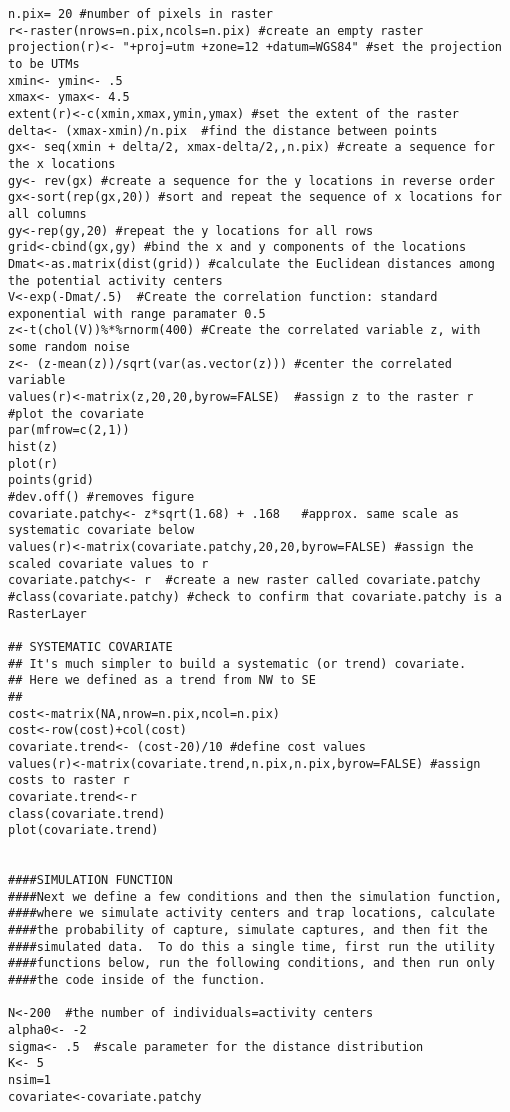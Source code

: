 \documentclass[12pt]{article}
\begin{document}
\begin{spacing}{1.2}
{\begin{verbatim}
n.pix= 20 #number of pixels in raster
r<-raster(nrows=n.pix,ncols=n.pix) #create an empty raster
projection(r)<- "+proj=utm +zone=12 +datum=WGS84" #set the projection to be UTMs
xmin<- ymin<- .5
xmax<- ymax<- 4.5
extent(r)<-c(xmin,xmax,ymin,ymax) #set the extent of the raster
delta<- (xmax-xmin)/n.pix  #find the distance between points 
gx<- seq(xmin + delta/2, xmax-delta/2,,n.pix) #create a sequence for the x locations
gy<- rev(gx) #create a sequence for the y locations in reverse order
gx<-sort(rep(gx,20)) #sort and repeat the sequence of x locations for all columns
gy<-rep(gy,20) #repeat the y locations for all rows
grid<-cbind(gx,gy) #bind the x and y components of the locations
Dmat<-as.matrix(dist(grid)) #calculate the Euclidean distances among the potential activity centers 
V<-exp(-Dmat/.5)  #Create the correlation function: standard exponential with range paramater 0.5
z<-t(chol(V))%*%rnorm(400) #Create the correlated variable z, with some random noise
z<- (z-mean(z))/sqrt(var(as.vector(z))) #center the correlated variable
values(r)<-matrix(z,20,20,byrow=FALSE)  #assign z to the raster r
#plot the covariate
par(mfrow=c(2,1)) 
hist(z)
plot(r)
points(grid)
#dev.off() #removes figure
covariate.patchy<- z*sqrt(1.68) + .168   #approx. same scale as systematic covariate below
values(r)<-matrix(covariate.patchy,20,20,byrow=FALSE) #assign the scaled covariate values to r
covariate.patchy<- r  #create a new raster called covariate.patchy
#class(covariate.patchy) #check to confirm that covariate.patchy is a RasterLayer

## SYSTEMATIC COVARIATE
## It's much simpler to build a systematic (or trend) covariate.
## Here we defined as a trend from NW to SE
## 
cost<-matrix(NA,nrow=n.pix,ncol=n.pix)
cost<-row(cost)+col(cost)
covariate.trend<- (cost-20)/10 #define cost values
values(r)<-matrix(covariate.trend,n.pix,n.pix,byrow=FALSE) #assign costs to raster r
covariate.trend<-r
class(covariate.trend)
plot(covariate.trend)


####SIMULATION FUNCTION
####Next we define a few conditions and then the simulation function, 
####where we simulate activity centers and trap locations, calculate
####the probability of capture, simulate captures, and then fit the 
####simulated data.  To do this a single time, first run the utility
####functions below, run the following conditions, and then run only 
####the code inside of the function.

N<-200  #the number of individuals=activity centers
alpha0<- -2  
sigma<- .5  #scale parameter for the distance distribution
K<- 5
nsim=1
covariate<-covariate.patchy


\end{verbatim}}
\end{spacing}
\end{document}
